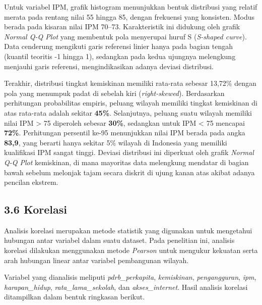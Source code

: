 \documentclass[
  12pt,
]{article}
\begin{document}
Untuk variabel IPM, grafik histogram menunjukkan bentuk distribusi yang
relatif merata pada rentang nilai 55 hingga 85, dengan frekuensi yang
konsisten. Modus berada pada kisaran nilai IPM 70--73. Karakteristik ini
didukung oleh grafik \textit{Normal Q-Q Plot} yang membentuk pola
menyerupai huruf S (\textit{S-shaped curve}). Data cenderung mengikuti
garis referensi linier hanya pada bagian tengah (kuantil teoritis -1
hingga 1), sedangkan pada kedua ujungnya melengkung menjauhi garis
referensi, mengindikasikan adanya deviasi distribusi.

Terakhir, distribusi tingkat kemiskinan memiliki rata-rata sebesar
13,72\% dengan pola yang menumpuk padat di sebelah kiri
(\textit{right-skewed}). Berdasarkan perhitungan probabilitas empiris,
peluang wilayah memiliki tingkat kemiskinan di atas rata-rata adalah
sekitar \textbf{45\%}. Selanjutnya, peluang suatu wilayah memiliki nilai
IPM \textgreater{} 75 diperoleh sebesar \textbf{30\%}, sedangkan untuk
IPM \textless{} 75 mencapai \textbf{72\%}. Perhitungan persentil ke-95
menunjukkan nilai IPM berada pada angka \textbf{83,9}, yang berarti
hanya sekitar 5\% wilayah di Indonesia yang memiliki kualifikasi IPM
sangat tinggi. Deviasi distribusi ini diperkuat oleh grafik
\textit{Normal Q-Q Plot} kemiskinan, di mana mayoritas data melengkung
mendatar di bagian bawah sebelum melonjak tajam secara diskrit di ujung
kanan atas akibat adanya pencilan ekstrem.

\vspace{0.2cm}

\subsection{\texorpdfstring{\normalsize 3.6 \hspace {0,5cm}
Korelasi}{3.6  Korelasi}}\label{korelasi}

\vspace{-0.5cm}

Analisis korelasi merupakan metode statistik yang digunakan untuk
mengetahui hubungan antar variabel dalam suatu dataset. Pada penelitian
ini, analisis korelasi dilakukan menggunakan metode \textit{Pearson}
untuk mengukur kekuatan serta arah hubungan linear antar variabel
pembangunan wilayah.

Variabel yang dianalisis meliputi \textit{pdrb_perkapita},
\textit{kemiskinan}, \textit{pengangguran}, \textit{ipm},
\textit{harapan_hidup}, \textit{rata_lama_sekolah}, dan
\textit{akses_internet}. Hasil analisis korelasi ditampilkan dalam
bentuk ringkasan berikut.
\end{document}
